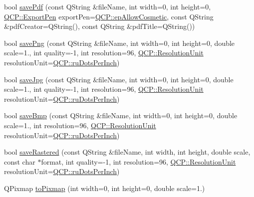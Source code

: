 \begin{DoxyCompactItemize}
bool \hyperlink{class_q_custom_plot_ad5acd34f6b39c3516887d7e54fec2412}{save\+Pdf} (const Q\+String \&file\+Name, int width=0, int height=0, \hyperlink{namespace_q_c_p_a17844f19e1019693a953e1eb93536d2f}{Q\+C\+P\+::\+Export\+Pen} export\+Pen=\hyperlink{namespace_q_c_p_a17844f19e1019693a953e1eb93536d2fa50d3657dba3fb90560b93a823cb0a6e8}{Q\+C\+P\+::ep\+Allow\+Cosmetic}, const Q\+String \&pdf\+Creator=Q\+String(), const Q\+String \&pdf\+Title=Q\+String())
\item 
bool \hyperlink{class_q_custom_plot_ac92cc9256d12f354b40a4be4600b5fb9}{save\+Png} (const Q\+String \&file\+Name, int width=0, int height=0, double scale=1., int quality=-\/1, int resolution=96, \hyperlink{namespace_q_c_p_a715d46153da230990aa887d0f0602452}{Q\+C\+P\+::\+Resolution\+Unit} resolution\+Unit=\hyperlink{namespace_q_c_p_a715d46153da230990aa887d0f0602452affb887d8efe79c39a1aca2acd7002afc}{Q\+C\+P\+::ru\+Dots\+Per\+Inch})
\item 
bool \hyperlink{class_q_custom_plot_a76f0d278e630a711fa6f48048cfd83e4}{save\+Jpg} (const Q\+String \&file\+Name, int width=0, int height=0, double scale=1., int quality=-\/1, int resolution=96, \hyperlink{namespace_q_c_p_a715d46153da230990aa887d0f0602452}{Q\+C\+P\+::\+Resolution\+Unit} resolution\+Unit=\hyperlink{namespace_q_c_p_a715d46153da230990aa887d0f0602452affb887d8efe79c39a1aca2acd7002afc}{Q\+C\+P\+::ru\+Dots\+Per\+Inch})
\item 
bool \hyperlink{class_q_custom_plot_ae3a86ed0795670e50afa21759d4fa13d}{save\+Bmp} (const Q\+String \&file\+Name, int width=0, int height=0, double scale=1., int resolution=96, \hyperlink{namespace_q_c_p_a715d46153da230990aa887d0f0602452}{Q\+C\+P\+::\+Resolution\+Unit} resolution\+Unit=\hyperlink{namespace_q_c_p_a715d46153da230990aa887d0f0602452affb887d8efe79c39a1aca2acd7002afc}{Q\+C\+P\+::ru\+Dots\+Per\+Inch})
\item 
bool \hyperlink{class_q_custom_plot_ad7723ce2edfa270632ef42b03a444352}{save\+Rastered} (const Q\+String \&file\+Name, int width, int height, double scale, const char $\ast$format, int quality=-\/1, int resolution=96, \hyperlink{namespace_q_c_p_a715d46153da230990aa887d0f0602452}{Q\+C\+P\+::\+Resolution\+Unit} resolution\+Unit=\hyperlink{namespace_q_c_p_a715d46153da230990aa887d0f0602452affb887d8efe79c39a1aca2acd7002afc}{Q\+C\+P\+::ru\+Dots\+Per\+Inch})
\item 
Q\+Pixmap \hyperlink{class_q_custom_plot_aabb974d71ce96c137dc04eb6eab844fe}{to\+Pixmap} (int width=0, int height=0, double scale=1.)
\item 

\end{DoxyCompactItemize}
